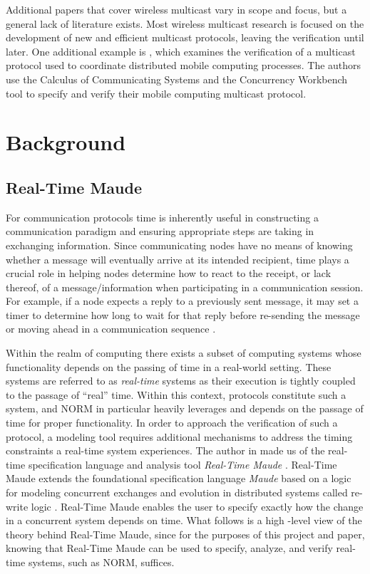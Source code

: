 \documentclass[10pt, journal]{IEEEtran}
\begin{document}
Additional papers that cover wireless multicast vary in scope and focus, but a general lack of literature exists. Most wireless multicast research is focused on the development of new and efficient multicast protocols, leaving the verification until later. One additional example is \cite{Anastasi2000}, which examines the verification of a multicast protocol used to coordinate distributed mobile computing processes. The authors use the Calculus of Communicating Systems \cite{Milner1989} and the Concurrency Workbench tool \cite{Cleaveland1996} to specify and verify their mobile computing multicast protocol. 

\section{Background}

\subsection{Real-Time Maude}

For communication protocols time is inherently useful in constructing a communication paradigm and ensuring appropriate steps are taking in exchanging information. Since communicating nodes have no means of knowing whether a message will eventually arrive at its intended recipient, time plays a crucial role in helping nodes determine how to react to the receipt, or lack thereof, of a message/information when participating in a communication session. For example, if a node expects a reply to a previously sent message, it may set a timer to determine how long to wait for that reply before re-sending the message or moving ahead in a communication sequence \cite{Lien2004}.

Within the realm of computing there exists a subset of computing systems whose functionality depends on the passing of time in a real-world setting. These systems are referred to as \textit{real-time} systems as their execution is tightly coupled to the passage of ``real'' time. Within this context, protocols constitute such a system, and NORM in particular heavily leverages and depends on the passage of time for proper functionality. In order to approach the verification of such a protocol, a modeling tool requires additional mechanisms to address the timing constraints a real-time system experiences. The author in \cite{Lien2004} made us of the real-time specification language and analysis tool \textit{Real-Time Maude} \cite{rtmaudeUrl, Olvezky2004}. Real-Time Maude extends the foundational specification language \textit{Maude} \cite{maudeUrl, Clavel2002} based on a logic for modeling concurrent exchanges and evolution in distributed systems called re-write logic \cite{Meseguer1992}. Real-Time Maude enables the user to specify exactly how the change in a concurrent system depends on time. What follows is a high -level view of the theory behind Real-Time Maude, since for the purposes of this project and paper, knowing that Real-Time Maude can be used to specify, analyze, and verify real-time systems, such as NORM, suffices.
\end{document}
